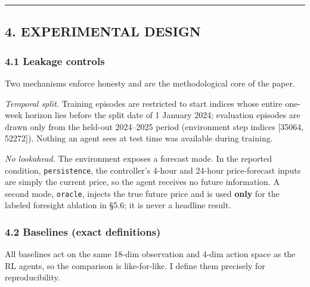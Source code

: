 \documentclass[
  11pt,
]{article}
\begin{document}
\begin{center}\rule{0.5\linewidth}{0.5pt}\end{center}

\subsection{4. EXPERIMENTAL DESIGN}\label{experimental-design}

\subsubsection{4.1 Leakage controls}\label{leakage-controls}

Two mechanisms enforce honesty and are the methodological core of the
paper.

\emph{Temporal split.} Training episodes are restricted to start indices
whose entire one-week horizon lies before the split date of 1 January
2024; evaluation episodes are drawn only from the held-out 2024--2025
period (environment step indices {[}35064, 52272{]}). Nothing an agent
sees at test time was available during training.

\emph{No lookahead.} The environment exposes a forecast mode. In the
reported condition, \texttt{persistence}, the controller's 4-hour and
24-hour price-forecast inputs are simply the current price, so the agent
receives no future information. A second mode, \texttt{oracle}, injects
the true future price and is used \textbf{only} for the labeled
foresight ablation in §5.6; it is never a headline result.

\subsubsection{4.2 Baselines (exact
definitions)}\label{baselines-exact-definitions}

All baselines act on the same 18-dim observation and 4-dim action space
as the RL agents, so the comparison is like-for-like. I define them
precisely for reproducibility.
\end{document}
